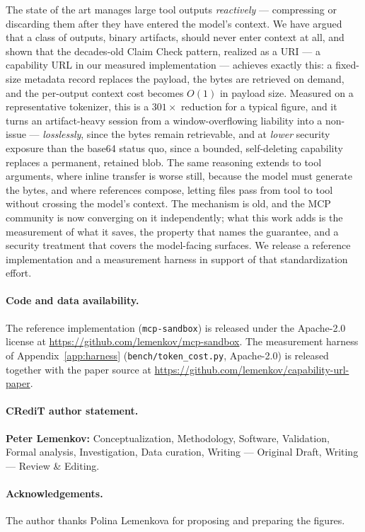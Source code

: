 \documentclass[11pt]{article}
\begin{document}
The state of the art manages large tool outputs \emph{reactively} --- compressing or discarding them after they have entered the model's context. We have argued that a class of outputs, binary artifacts, should never enter context at all, and shown that the decades-old Claim Check pattern, realized as a URI --- a capability URL in our measured implementation --- achieves exactly this: a fixed-size metadata record replaces the payload, the bytes are retrieved on demand, and the per-output context cost becomes $O(1)$ in payload size. Measured on a representative tokenizer, this is a $301\times$ reduction for a typical figure, and it turns an artifact-heavy session from a window-overflowing liability into a non-issue --- \emph{losslessly}, since the bytes remain retrievable, and at \emph{lower} security exposure than the base64 status quo, since a bounded, self-deleting capability replaces a permanent, retained blob. The same reasoning extends to tool arguments, where inline transfer is worse still, because the model must generate the bytes, and where references compose, letting files pass from tool to tool without crossing the model's context. The mechanism is old, and the MCP community is now converging on it independently; what this work adds is the measurement of what it saves, the property that names the guarantee, and a security treatment that covers the model-facing surfaces. We release a reference implementation and a measurement harness in support of that standardization effort.

\paragraph{Code and data availability.} The reference implementation (\texttt{mcp-sandbox}) is released under the Apache-2.0 license at \url{https://github.com/lemenkov/mcp-sandbox}. The measurement harness of Appendix~\ref{app:harness} (\texttt{bench/token\_cost.py}, Apache-2.0) is released together with the paper source at \url{https://github.com/lemenkov/capability-url-paper}.

\paragraph{CRediT author statement.} \textbf{Peter Lemenkov:} Conceptualization, Methodology, Software, Validation, Formal analysis, Investigation, Data curation, Writing --- Original Draft, Writing --- Review \& Editing.

\paragraph{Acknowledgements.} The author thanks Polina Lemenkova for proposing and preparing the figures.
\end{document}
